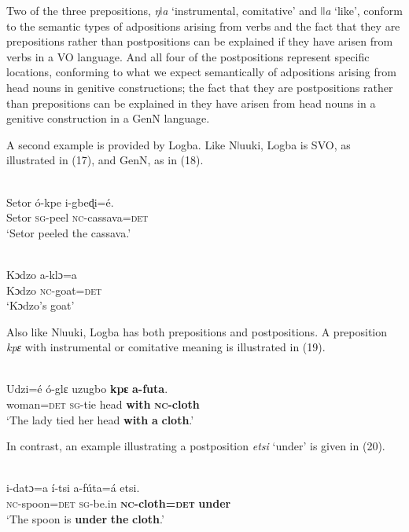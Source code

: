 \documentclass[output=paper]{langsci/langscibook}
\begin{document}
Two of the three prepositions, \textit{ŋǀa} ‘instrumental, comitative’ and \textit{ǀǀa} ‘like’, conform to the semantic types of adpositions arising from verbs and the fact that they are prepositions rather than postpositions can be explained if they have arisen from verbs in a VO language. And all four of the postpositions represent specific locations, conforming to what we expect semantically of adpositions arising from head nouns in genitive constructions; the fact that they are postpositions rather than prepositions can be explained in they have arisen from head nouns in a genitive construction in a GenN language.

A second example is provided by Logba. Like Nǀuuki, Logba is SVO, as illustrated in (17), and GenN, as in (18).

\ea\label{ex:dryer:}
\\
\gll Setor  ó-kpe  i-gbeɖi=é.\\
       Setor  \textsc{sg}{}-peel  \textsc{nc}{}-cassava=\textsc{det}\\
\glt   ‘Setor peeled the cassava.’ 
\z

\ea\label{ex:dryer:}
\\
\gll Kɔdzo    a-klɔ=a\\
       Kɔdzo    \textsc{nc}{}-goat=\textsc{det}\\
\glt   ‘Kɔdzo’s goat’ 
\z

Also like Nǀuuki, Logba has both prepositions and postpositions. A preposition \textit{kpɛ} with instrumental or comitative meaning is illustrated in (19).

\ea\label{ex:dryer:}
\\
\gll Udzi=é  ó-glɛ  uzugbo  \textbf{kpɛ}  \textbf{a-futa}.\\
       woman=\textsc{det}  \textsc{sg}{}-tie  head  \textbf{with}  \textbf{\textsc{nc}}\textbf{{}-cloth}  \\
\glt ‘The lady tied her head \textbf{with} \textbf{a} \textbf{cloth}.’  
\z

In contrast, an example illustrating a postposition \textit{etsi} ‘under’ is given in (20).

\ea\label{ex:dryer:}
\\
\gll i-datɔ=a  í-tsi  a-fúta=á  etsi.\\
       \textsc{nc}{}-spoon=\textsc{det}  \textsc{sg}{}-be.in  \textbf{\textsc{nc}}\textbf{{}-cloth=}\textbf{\textsc{det}}  \textbf{under}\\
\glt   ‘The spoon is \textbf{under} \textbf{the} \textbf{cloth}.’ 
\z
\end{document}
